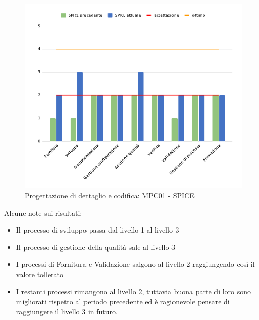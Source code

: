 \begin{figure}[H]
    \centering
    \includegraphics[scale=0.50]{Sezioni/images/pdc-spice.png}
    \caption{Progettazione di dettaglio e codifica: MPC01 - SPICE}
\end{figure}

   Alcune note sui risultati:
\begin{itemize}
\item Il processo di sviluppo passa dal livello 1 al livello 3
\item Il processo di gestione della qualità sale al livello 3
\item I processi di Fornitura e Validazione salgono al livello 2 raggiungendo così il valore tollerato
\item I restanti processi rimangono al livello 2, tuttavia buona parte di loro sono migliorati rispetto al periodo precedente ed è ragionevole pensare di raggiungere il livello 3 in futuro.
\end{itemize}


